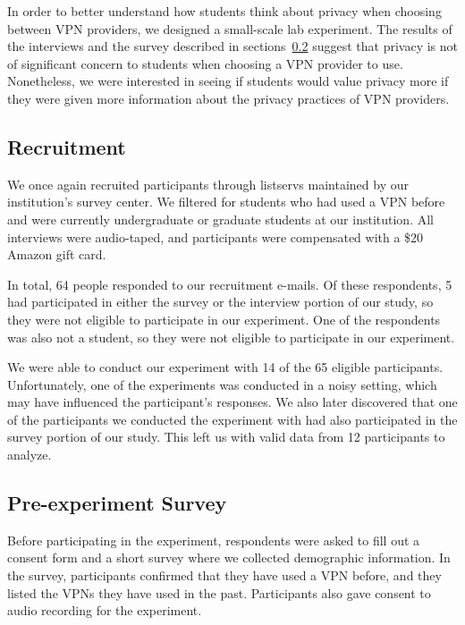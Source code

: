 In order to better understand how students think about privacy when choosing between VPN providers, we designed a small-scale lab experiment. 
The results of the interviews and the survey described in sections~\ref{} suggest that privacy is not of significant concern to students when choosing a VPN provider to use.
Nonetheless, we were interested in seeing if students would value privacy more if they were given more information about the privacy practices of VPN providers.

\subsection{Recruitment} 
We once again recruited participants through listservs maintained by our institution's survey center.
We filtered for students who had used a VPN before and were currently undergraduate or graduate students at our institution.
All interviews were audio-taped, and participants were compensated with a \$20 Amazon gift card.

In total, 64 people responded to our recruitment e-mails.
Of these respondents, 5 had participated in either the survey or the interview portion of our study, so they were not eligible to participate in our experiment.
One of the respondents was also not a student, so they were not eligible to participate in our experiment.

We were able to conduct our experiment with 14 of the 65 eligible participants. 
Unfortunately, one of the experiments was conducted in a noisy setting, which may have influenced the participant's responses.
We also later discovered that one of the participants we conducted the experiment with had also participated in the survey portion of our study.
This left us with valid data from 12 participants to analyze.

\subsection{Pre-experiment Survey} 
Before participating in the experiment, respondents were asked to fill out a consent form and a short survey where we collected demographic information.
In the survey, participants confirmed that they have used a VPN before, and they listed the VPNs they have used in the past.
Participants also gave consent to audio recording for the experiment.

